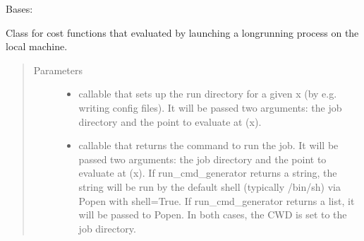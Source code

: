 \documentclass[letterpaper,12pt,english]{sphinxmanual}
\begin{document}
\begin{fulllineitems}
\label{\detokenize{PARyOpt.evaluators:PARyOpt.evaluators.async_local.AsyncLocalEvaluator}}
\sphinxAtStartPar
Bases: {\hyperref[\detokenize{PARyOpt.evaluators:PARyOpt.evaluators.paryopt_async.AsyncFunctionEvaluator}]{}}

\sphinxAtStartPar
Class for cost functions that evaluated by launching a long\sphinxhyphen{}running process on the local machine.
\begin{quote}\begin{description}
\item[{Parameters}] \leavevmode\begin{itemize}
\item {} 
\sphinxAtStartPar
{} \textendash{} callable that sets up the run directory for a given x (by e.g. writing config files).     It will be passed two arguments: the job directory and the point to evaluate at (x).

\item {} 
\sphinxAtStartPar
{} \textendash{} callable that returns the command to run the job.     It will be passed two arguments: the job directory and the point to evaluate at (x).     If run\_cmd\_generator returns a string, the string will be run by the default shell (typically /bin/sh)     via Popen with shell=True. If run\_cmd\_generator returns a list, it will be passed to Popen.     In both cases, the CWD is set to the job directory.


\end{itemize}
\end{description}
\end{quote}
\end{fulllineitems}
\end{document}
